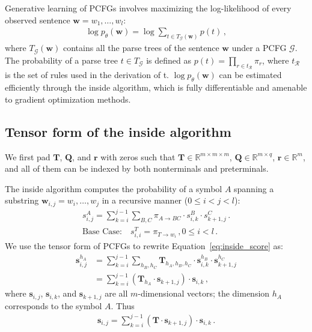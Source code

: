 \documentclass[11pt]{article}
\newcommand{\mbs}{\boldsymbol}
\begin{document}
Generative learning of PCFGs involves maximizing the log-likelihood of every observed sentence $\mbs{w}=w_1,\ldots,w_l$:
\begin{align*}
\log p_{\theta}(\mbs{w}) = \log\sum_{t\in T_{\mathcal{G}}(\mbs{w})}  p(t)\,,
\end{align*}
where $T_{\mathcal{G}}(\mbs{w})$ contains all the parse trees of the sentence $\mbs{w}$ under a PCFG $\mathcal{G}$. The probability of a parse tree $t \in T_{\mathcal{G}}$ is defined as $p(t) = \prod_{r\in t_{\mathcal{R}}} \pi_{r}$, where $t_{\mathcal{R}}$ is the set of rules used in the derivation of t. $\log p_{\theta}(\mbs{w})$ can be estimated efficiently through the inside algorithm, which is fully differentiable and amenable to gradient optimization methods. 

















\subsection{Tensor form of the inside algorithm}\label{sec:t-inside}

We first pad $\mathbf{T}$, $\mathbf{Q}$, and $\mathbf{r}$ with zeros such that $\mathbf{T}\in\mathbb{R}^{m\times m\times m}$,  $\mathbf{Q}\in\mathbb{R}^{m\times q}$, $\mathbf{r}\in\mathbb{R}^{m}$,
and all of them can be indexed by both nonterminals and preterminals.


The inside algorithm computes the probability of a symbol $A$ spanning a substring $\mbs{w}_{i, j} = w_{i},\ldots,w_j$ in a recursive manner ($0\leq i < j < l$):
\begin{align}\label{eq:inside_score}
s_{i, j}^{A} = \sum_{k = i}^{j - 1} \sum_{B, C}\pi_{A\rightarrow BC} \cdot 
s_{i, k}^{B} \cdot s_{k + 1, j}^{C}\,. \\
\text{Base Case:}\quad s_{i, i}^{T} = \pi_{T\rightarrow w_i}\,,  0\leq i < l\,. \nonumber
\end{align}
We use the tensor form of PCFGs to rewrite Equation~\ref{eq:inside_score} as:
\begin{align}
\mathbf{s}_{i, j}^{h_A} &= \sum_{k = i}^{j - 1}  \sum_{h_B, h_C}
\mathbf{T}_{h_A, h_B, h_C} \cdot \mathbf{s}_{i, k}^{h_B} \cdot \mathbf{s}_{k + 1, j}^{h_C}\nonumber \\
&= \sum_{k = i}^{j - 1}\left(\mathbf{T}_{h_A}\cdot \mathbf{s}_{k + 1, j}\right)\cdot \mathbf{s}_{i, k}\,,
\end{align}
where $\mathbf{s}_{i, j}$, $\mathbf{s}_{i, k}$, and $\mathbf{s}_{k+1, j}$ are all $m$-dimensional vectors; 
the dimension $h_A$ corresponds to the symbol $A$. 
Thus
\begin{align}\label{eq:inside_tensor}
\mathbf{s}_{i, j} = \sum_{k = i}^{j - 1}\left(\mathbf{T}\cdot \mathbf{s}_{k + 1, j}\right)\cdot \mathbf{s}_{i, k}\,.
\end{align}
\end{document}
